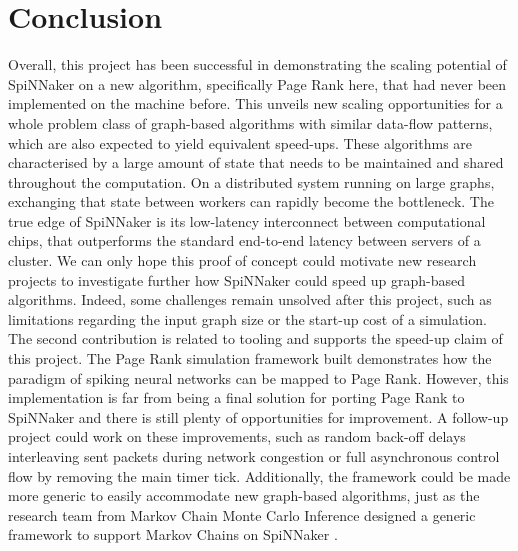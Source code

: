 \section{Conclusion}

Overall, this project has been successful in demonstrating the scaling potential of SpiNNaker on a new algorithm, specifically Page Rank here, that had never been implemented on the machine before. This unveils new scaling opportunities for a whole problem class of graph-based algorithms with similar data-flow patterns, which are also expected to yield equivalent speed-ups. These algorithms are characterised by a large amount of state that needs to be maintained and shared throughout the computation. On a distributed system running on large graphs, exchanging that state between workers can rapidly become the bottleneck. The true edge of SpiNNaker is its low-latency interconnect between computational chips, that outperforms the standard end-to-end latency between servers of a cluster. We can only hope this proof of concept could motivate new research projects to investigate further how SpiNNaker could speed up graph-based algorithms. Indeed, some challenges remain unsolved after this project, such as limitations regarding the input graph size or the start-up cost of a simulation. \\

The second contribution is related to tooling and supports the speed-up claim of this project. The Page Rank simulation framework built demonstrates how the paradigm of spiking neural networks can be mapped to Page Rank. However, this implementation is far from being a final solution for porting Page Rank to SpiNNaker and there is still plenty of opportunities for improvement. A follow-up project could work on these improvements, such as random back-off delays interleaving sent packets during network congestion or full asynchronous control flow by removing the main timer tick. Additionally, the framework could be made more generic to easily accommodate new graph-based algorithms, just as the research team from Markov Chain Monte Carlo Inference designed a generic framework to support Markov Chains on SpiNNaker \cite{markov-on-spinn}. \\


%





